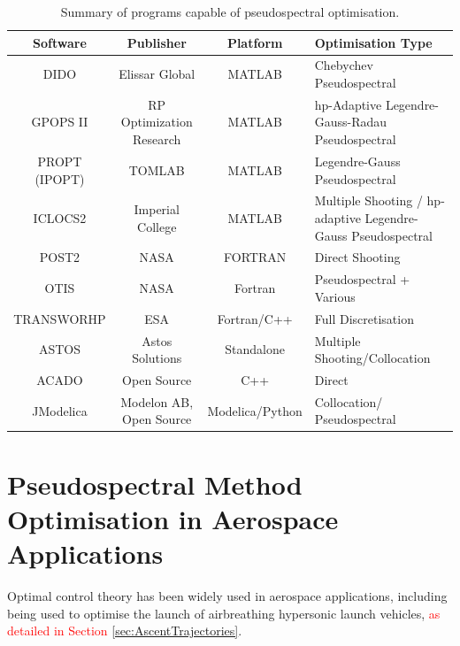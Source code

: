 \begin{table}[ht]
	
	\begin{tabular}{|c|c|c| p{4cm}|}
		\hline \textbf{Software} & \textbf{Publisher} & \textbf{Platform} & \textbf{Optimisation Type} \\ 
		\hline DIDO\cite{Ross2002} & Elissar Global & MATLAB & Chebychev Pseudospectral \\ 
		\hline GPOPS II\cite{Rao2010} & RP Optimization Research & MATLAB & \textsf{hp}-Adaptive Legendre-Gauss-Radau Pseudospectral \\ 
		\hline PROPT (IPOPT)\cite{Rutquist2010}& TOMLAB & MATLAB & Legendre-Gauss  Pseudospectral  \\ 
		\hline ICLOCS2\cite{iclocs} & Imperial College & MATLAB &  Multiple Shooting / \textsf{hp}-adaptive Legendre-Gauss Pseudospectral  \\ 
		\hline POST2\cite{WilliamColson} & NASA & FORTRAN & Direct Shooting \\ 
		\hline OTIS\cite{otis} & NASA  & Fortran & Pseudospectral + Various  \\ 
		\hline TRANSWORHP\cite{Wassel2013} & ESA & Fortran/C++ & Full Discretisation \\ 
		\hline ASTOS\cite{astos} & Astos Solutions & Standalone & Multiple Shooting/Collocation  \\  
		\hline ACADO\cite{Houska2011} & Open Source & C++ &  Direct \\  
		\hline JModelica\cite{jmodelica} & Modelon AB, Open Source & Modelica/Python &  Collocation/ Pseudospectral \\  
		
		\hline 
	\end{tabular} 
	
	\caption{Summary of programs capable of pseudospectral optimisation.}
	\label{table:programs}
\end{table}




\section{Pseudospectral Method Optimisation in Aerospace Applications}
Optimal control theory has been widely used in aerospace applications, including being used to optimise the launch of airbreathing hypersonic launch vehicles\cite{Powell1991,Lu1993,Trefny1999,Roche2000,Pescetelli2012,Young2006}, \textcolor{red}{as detailed in Section \ref{sec:AscentTrajectories}}.











